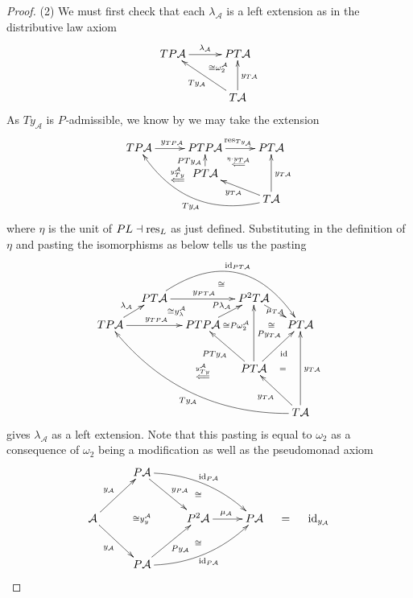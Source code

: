 \documentclass[a4paper,oneside,english]{amsart}
\numberwithin{equation}{section}
\numberwithin{figure}{section}
\theoremstyle{plain}
\theoremstyle{definition}
\theoremstyle{remark}
\theoremstyle{definition}
\theoremstyle{plain}
\theoremstyle{plain}
\theoremstyle{plain}
\begin{document}
\begin{proof}
(2) We must first check that each $\lambda_{\mathcal{A}}$ is a left
extension as in the distributive law axiom 
\[
\xymatrix@=1em{TP\mathcal{A}\ar[rr]^{\lambda_{\mathcal{A}}} &  & PT\mathcal{A}\ar@{}[dl]|-{\cong\omega_{2}^{\mathcal{A}}}\\
 & \;\\
 &  & T\mathcal{A}\ar[uu]_{y_{T\mathcal{A}}}\ar[uull]^{Ty_{\mathcal{A}}}
}
\]
As $Ty_{\mathcal{A}}$ is \emph{$P$-}admissible, we know by \cite[Remark 16]{yonedakz}
we may take the extension 
\[
\xymatrix@=1em{TP\mathcal{A}\ar[rr]^{y_{TP\mathcal{A}}} &  & PTP\mathcal{A}\ar[rr]^{\textnormal{res}_{Ty_{\mathcal{A}}}} &  & PT\mathcal{A}\\
\;\ar@{}[rr]|-{\quad\quad\stackrel{y_{Ty}^{\mathcal{A}}}{\Longleftarrow}} &  & PT\mathcal{A}\ar[u]^{PTy_{\mathcal{A}}}\ar@{}[rru]|-{\stackrel{\eta\cdot y_{T\mathcal{A}}}{\Longleftarrow}}\\
 &  &  &  & T\mathcal{A}\ar[uu]_{y_{T\mathcal{A}}}\ar@/^{2pc}/[ululll]^{Ty_{\mathcal{A}}}\ar[ull]^{y_{T\mathcal{A}}}
}
\]
where $\eta$ is the unit of $PL\dashv\textnormal{res}_{L}$ as just
defined. Substituting in the definition of $\eta$ and pasting the
isomorphisms as below tells us the pasting 
\[
\xymatrix@=1em{ &  & \;\ar@{}[rd]|-{\cong}\\
 & PT\mathcal{A}\ar[rr]^{y_{PT\mathcal{A}}}\ar@/^{3pc}/[rrrd]^{\textnormal{id}_{PT\mathcal{A}}}\ar@{}[rd]|-{\cong y_{\lambda}^{\mathcal{A}}} &  & P^{2}T\mathcal{A}\ar[rd]|-{\mu_{T\mathcal{A}}}\\
TP\mathcal{A}\ar[rr]^{y_{TP\mathcal{A}}}\ar[ru]^{\lambda_{\mathcal{A}}} &  & PTP\mathcal{A}\ar[ur]^{P\lambda_{\mathcal{A}}} & \;\ar@{}[l]|-{\cong P\omega_{2}^{\mathcal{A}}}\ar@{}[r]|-{\cong} & PT\mathcal{A}\\
 &  & \; & \;\\
 &  &  & PT\mathcal{A}\ar[uul]^{PTy_{\mathcal{A}}}\ar[rruul]_{\textnormal{id}}\ar[ruulu]_{Py_{T\mathcal{A}}} & \;\ar@{}[l]|-{=}\\
 &  & \;\ar@{}[uu]|-{\stackrel{y_{Ty}^{\mathcal{A}}}{\Longleftarrow}}\\
 &  &  &  & T\mathcal{A}\ar[uuuu]_{y_{T\mathcal{A}}}\ar@/^{2pc}/[uluuulll]^{Ty_{\mathcal{A}}}\ar[uul]^{y_{T\mathcal{A}}}
}
\]
gives $\lambda_{\mathcal{A}}$ as a left extension. Note that this
pasting is equal to $\omega_{2}$ as a consequence of $\omega_{2}$
being a modification as well as the pseudomonad axiom
\[
\xymatrix@=1em{ &  & P\mathcal{A}\ar[rrdd]^{y_{P\mathcal{A}}}\ar@/^{1pc}/[ddrrrr]^{\textnormal{id}_{P\mathcal{A}}}\\
 &  &  &  & \ar@{}[]|-{\cong}\\
\mathcal{A}\ar[rruu]^{y_{\mathcal{A}}}\ar[rrdd]_{y_{\mathcal{A}}} &  & \ar@{}[]|-{\cong y_{y}^{\mathcal{A}}} &  & P^{2}\mathcal{A}\ar[rr]^{\mu_{\mathcal{A}}} &  & P\mathcal{A} & = & \textnormal{id}_{y_{\mathcal{A}}}\\
 &  &  &  & \ar@{}[]|-{\cong}\\
 &  & P\mathcal{A}\ar[rruu]_{Py_{\mathcal{A}}}\ar@/_{1pc}/[uurrrr]_{\textnormal{id}_{P\mathcal{A}}}
}
\]


\end{proof}
\end{document}
